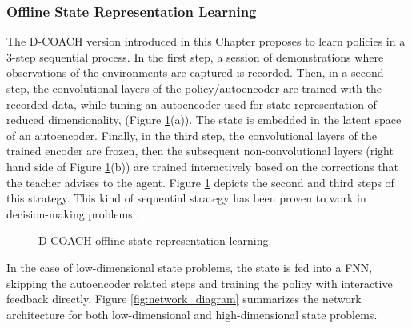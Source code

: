 \subsubsection{Offline State Representation Learning}
The D-COACH version introduced in this Chapter proposes to learn policies in a 3-step sequential process. In the first step, a session of demonstrations where observations of the environments are captured is recorded. Then, in a second step, the convolutional layers of the policy/autoencoder are trained with the recorded data, while tuning an  autoencoder  used  for state representation of reduced dimensionality, (Figure \ref{fig:ms}(a)). The state is embedded in the latent space of an autoencoder. Finally, in the third step, the convolutional layers of the trained encoder are frozen, then the subsequent non-convolutional layers (right hand side of Figure \ref{fig:ms}(b)) are trained interactively based on the corrections that the teacher advises to the agent. Figure \ref{fig:ms} depicts the second and third steps of this strategy. This kind of sequential strategy has been proven to work in decision-making problems \cite{Warnell2017,Finn2015,Ha2018}.

\begin{figure}[h]
\centering
{}
\hspace{0.1cm}
\caption{D-COACH offline state representation learning.} 
\label{fig:ms} 
\end{figure}

In the case of low-dimensional state problems, the state is fed into a FNN, skipping the autoencoder related steps and training the policy with interactive feedback directly. Figure \ref{fig:network_diagram} summarizes the network architecture for both low-dimensional and high-dimensional state problems.

